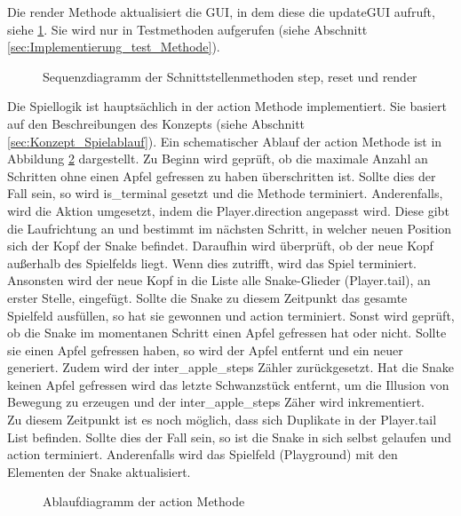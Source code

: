 Die render Methode aktualisiert die GUI, in dem diese die updateGUI aufruft, siehe \ref{fig:Implementierung_Sequenzdiagram}. Sie wird nur in Testmethoden aufgerufen (siehe Abschnitt \ref{sec:Implementierung_test_Methode}).
\begin{figure}[H]
	\centering
	\def\svgscale{0.110}
	
	\caption[Sequenzdiagram]{Sequenzdiagramm der Schnittstellenmethoden step, reset und render}
	\label{fig:Implementierung_Sequenzdiagram}
\end{figure}
Die Spiellogik ist hauptsächlich in der action Methode implementiert. Sie basiert auf den Beschreibungen des Konzepts (siehe Abschnitt \ref{sec:Konzept_Spielablauf}). Ein schematischer Ablauf der action Methode ist in Abbildung \ref{fig:Implementierung_action_method} dargestellt. 
Zu Beginn wird geprüft, ob die maximale Anzahl an Schritten ohne einen Apfel gefressen zu haben überschritten ist. Sollte dies der Fall sein, so wird is\_terminal gesetzt und die Methode terminiert. Anderenfalls, wird die Aktion umgesetzt, indem die Player.direction angepasst wird. Diese gibt die Laufrichtung an und bestimmt im nächsten Schritt, in welcher neuen Position sich der Kopf der Snake befindet. Daraufhin wird überprüft, ob der neue Kopf außerhalb des Spielfelds liegt. Wenn dies zutrifft, wird das Spiel terminiert.
Ansonsten wird der neue Kopf in die Liste alle Snake-Glieder (Player.tail), an erster Stelle, eingefügt. Sollte die Snake zu diesem Zeitpunkt das gesamte Spielfeld ausfüllen, so hat sie gewonnen und action terminiert. Sonst wird geprüft, ob die Snake im momentanen Schritt einen Apfel gefressen hat oder nicht. Sollte sie einen Apfel gefressen haben, so wird der Apfel entfernt und ein neuer generiert. Zudem wird der inter\_apple\_steps Zähler zurückgesetzt. Hat die Snake keinen Apfel gefressen wird das letzte Schwanzstück entfernt, um die Illusion von Bewegung zu erzeugen und der inter\_apple\_steps Zäher wird inkrementiert.\\
Zu diesem Zeitpunkt ist es noch möglich, dass sich Duplikate in der Player.tail List befinden. Sollte dies der Fall sein, so ist die Snake in sich selbst gelaufen und action terminiert. Anderenfalls wird das Spielfeld (Playground) mit den Elementen der Snake aktualisiert.
\begin{figure}[H]
	\centering
	\def\svgscale{0.095}
	
	\caption[Ablaufdiagramm der action Methode]{Ablaufdiagramm der action Methode}
	\label{fig:Implementierung_action_method}
\end{figure}

